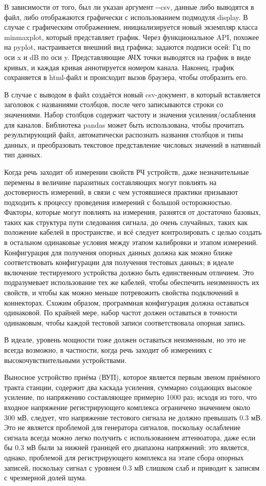 \documentclass{report}
\begin{document}
В зависимости от того, был ли указан аргумент -{}-csv, данные либо выводятся в файл, либо отображаются графически с использованием подмодуля display. В случае с графическим отображением, инициализируется новый экземпляр класса minmaxplot, который представляет график. Через функциональное API, похожее на pyplot, настраивается внешний вид графика; задаются подписи осей: Гц по оси x и dB по оси y. Представляющие АЧХ точки выводятся на график в виде кривых, и каждая кривая аннотируется номером канала. Наконец, график сохраняется в html-файл и происходит вызов браузера, чтобы отобразить его.

В случае с выводом в файл создаётся новый csv-документ, в который вставляется заголовок с названиями столбцов, после чего записываются строки со значениями. Набор столбцов содержит частоту и значения усиления/ослабления для каналов. Библиотека pandas может быть использована, чтобы прочитать результирующий файл, автоматически распознать названия столбцов и типы данных, и преобразовать текстовое представление числовых значений в нативный тип данных.

Когда речь заходит об измерении свойств РЧ устройств, даже незначительные перемены в величине паразитных составляющих могут повлиять на достоверность измерений, в связи с чем устоявшиеся практики призывают подходить к процессу проведения измерений с большой осторожностью. Факторы, которые могут повлиять на измерения, разнятся от достаточно базовых, таких как структура пути следования сигнала, до очень случайных, таких как положение кабелей в пространстве, и всё следует контролировать с целью создать в остальном одинаковые условия между этапом калибровки и этапом измерений. Конфигурация для получения опорных данных должна как можно ближе соответствовать конфигурации для получения тестовых данных; в идеале включение тестируемого устройства должно быть единственным отличием. Это подразумевает использование тех же кабелей, чтобы обеспечить неизменность их свойств, и чтобы как можно меньше потревожить свойства подключений в коннекторах. Схожим образом, программная конфигурация должна оставаться одинаковой. По крайней мере, набор частот должен оставаться в точности одинаковым, чтобы каждой тестовой записи соответствовала опорная запись.

В идеале, уровень мощности тоже должен оставаться неизменным, но это не всегда возможно, в частности, когда речь заходит об измерениях с высокочувствительными устройствами.

Выносное устройство приёма (ВУП), которое является первым звеном приёмного тракта станции, содержит два каскада усиления, суммарно создающих высокое усиление, по напряжению составляющее примерно 1000 раз; исходя из того, что входное напряжение регистрирующего комплекса ограничено значением около 300 мВ, следует, что напряжение тестового сигнала не должно превышать 0.3 мВ. Это не является проблемой для генератора сигналов, поскольку ослабление сигнала всегда можно легко получить с использованием аттенюатора, даже если бы 0.3 мВ были за нижней границей его диапазона напряжений; это является, однако, проблемой для регистрирующего комплекса на этапе сбора опорных записей, поскольку сигнал с уровнем 0.3 мВ слишком слаб и приводит к записям с чрезмерной долей шума.
\end{document}
